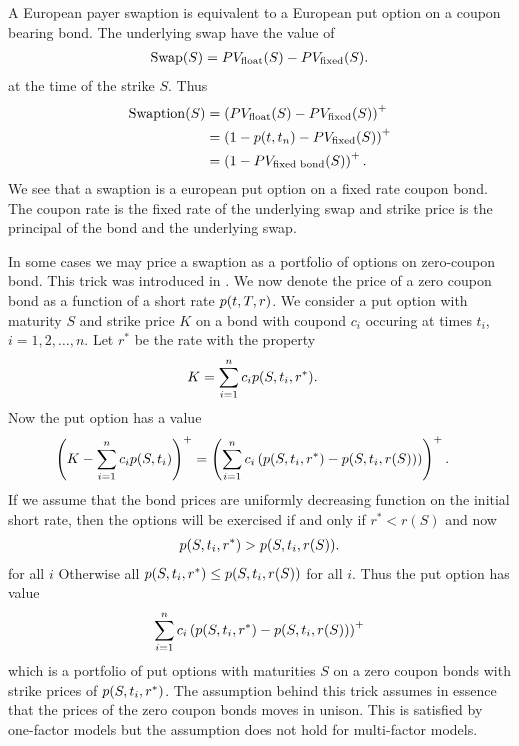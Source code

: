 A European payer swaption is equivalent to a European put option on a coupon bearing bond. The underlying swap have the value of
  	\begin{align}
		\operatorname{\mathrm{Swap}}(S) = PV_{\text{float}}(S) - PV_{\text{fixed}}(S) .
	\end{align}
at the time of the strike $S$. Thus
	\begin{align}
		\operatorname{\mathrm{Swaption}}(S) &= \left( PV_{\text{float}}(S) - PV_{\text{fixed}}(S) \right)^+ \\
			&= \left( 1 - p (t,t_n) - PV_{\text{fixed}}(S) \right)^+ \\
			&= \left( 1 - PV_{\text{fixed bond}}(S) \right)^+ .
	\end{align}
We see that a swaption is a european put option on a fixed rate coupon bond. The coupon rate is the fixed rate of the underlying swap and strike price is the principal of the bond and the underlying swap. 

In some cases we may price a swaption as a portfolio of options on zero-coupon bond. This trick was introduced in \cite{jamshidian1989anexactbondoptionformula}. We now denote the price of a zero coupon bond as a function of a short rate $p(t,T,r)$. We consider a put option with maturity $S$ and strike price $K$ on a bond with coupond $c_i$ occuring at times $t_i$, $i=1,2, \ldots, n$. Let $r^*$ be the rate with the property
	\begin{align}
		K &= \sum_{i=1}^n c_i p(S, t_i, r^*)  .
	\end{align}
Now the put option has a value 
	\begin{align}
		\left( K - \sum_{i=1}^n c_i p(S,t_i) \right)^+ &= \left( \sum_{i=1}^n c_i \left( p(S, t_i, r^*) - p(S,t_i,r(S)) \right) \right)^+ .
	\end{align}
If we assume that the bond prices are uniformly decreasing function on the initial short rate, then the options will be exercised if and only if $r^* < r(S)$ and now
	\begin{align}
		p(S, t_i, r^*) > p(S,t_i,r(S)) .
	\end{align}
for all $i$ Otherwise all $p(S, t_i, r^*) \leq p(S,t_i,r(S))$ for all $i$. Thus the put option has value
	\begin{align}
		\sum_{i=1}^n c_i \left( p(S, t_i, r^*) - p(S,t_i,r(S)) \right)^+
	\end{align}
which is a portfolio of put options with maturities $S$ on a zero coupon bonds with strike prices of $p(S, t_i, r^*)$. The assumption behind this trick assumes in essence that the prices of the zero coupon bonds moves in unison. This is satisfied by one-factor models but the assumption does not hold for multi-factor models.

